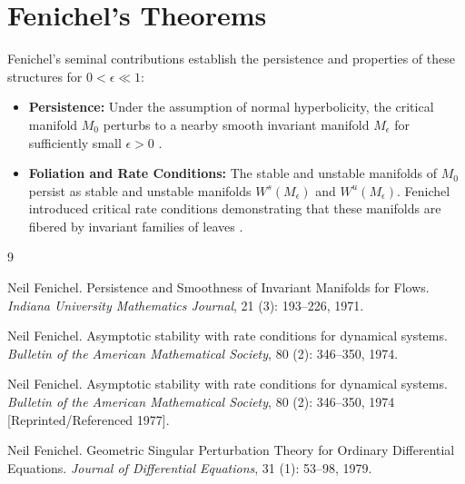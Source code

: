 \documentclass[11pt,a4paper]{article}
\begin{document}
\section{Fenichel's Theorems}
Fenichel's seminal contributions establish the persistence and properties of these structures for $0 < \epsilon \ll 1$:
\begin{itemize}
    \item \textbf{Persistence:} Under the assumption of normal hyperbolicity, the critical manifold $M_0$ perturbs to a nearby smooth invariant manifold $M_\epsilon$ for sufficiently small $\epsilon > 0$ \citep{Fenichel1971, Fenichel1979}.
    \item \textbf{Foliation and Rate Conditions:} The stable and unstable manifolds of $M_0$ persist as stable and unstable manifolds $W^s(M_\epsilon)$ and $W^u(M_\epsilon)$. Fenichel introduced critical rate conditions demonstrating that these manifolds are fibered by invariant families of leaves \citep{Fenichel1974, Fenichel1977}.
\end{itemize}

\begin{thebibliography}{9}

Neil Fenichel.
\newblock Persistence and Smoothness of Invariant Manifolds for Flows.
\newblock \emph{Indiana University Mathematics Journal}, 21 (3): 193--226, 1971.

Neil Fenichel.
\newblock Asymptotic stability with rate conditions for dynamical systems.
\newblock \emph{Bulletin of the American Mathematical Society}, 80 (2): 346--350, 1974.

Neil Fenichel.
\newblock Asymptotic stability with rate conditions for dynamical systems.
\newblock \emph{Bulletin of the American Mathematical Society}, 80 (2): 346--350, 1974 [Reprinted/Referenced 1977].

Neil Fenichel.
\newblock Geometric Singular Perturbation Theory for Ordinary Differential Equations.
\newblock \emph{Journal of Differential Equations}, 31 (1): 53--98, 1979.

\end{thebibliography}
\end{document}

